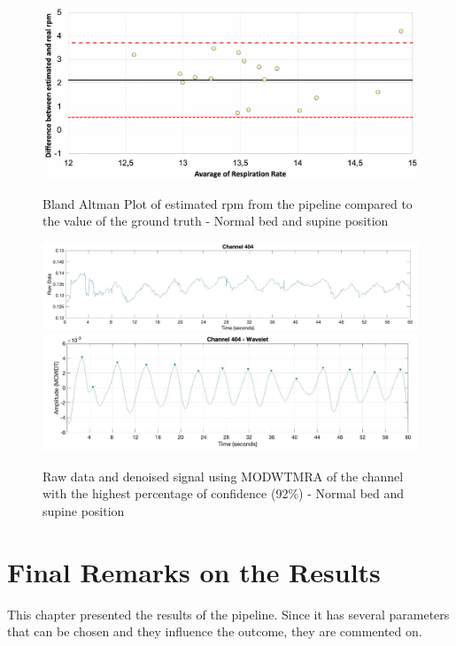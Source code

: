 \begin{figure}[p]
  \centering
  \includegraphics[width=\textwidth]{img/balnd1.pdf}

  \caption{Bland Altman Plot of estimated rpm from the pipeline compared to the value of the ground truth - Normal bed and supine position}
  \label{fig:baln1}
  \vspace{1.5cm}
  \includegraphics[width=\textwidth]{img/404.jpg}
  \includegraphics[width=\textwidth]{img/404_wave.jpg}
\caption{Raw data and denoised signal using MODWTMRA of the channel with the highest percentage of confidence (92\%) - Normal bed and supine position}
  \label{fig:rec}
\end{figure}




\section{Final Remarks on the Results}

This chapter presented the results of the pipeline. Since it has several parameters that can be chosen and they influence the outcome, they are commented on.

